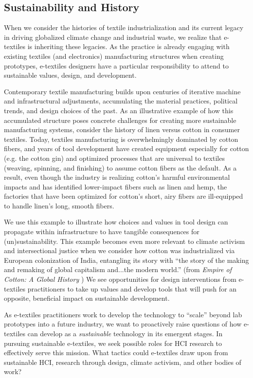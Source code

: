 \subsection{Sustainability and History}

When we consider the histories of textile industrialization and its current legacy in driving globalized climate change and industrial waste, we realize that e-textiles is inheriting these legacies. As the practice is already engaging with existing textiles (and electronics) manufacturing structures when creating prototypes, e-textiles designers have a particular responsibility to attend to sustainable values, design, and development. 

Contemporary textile manufacturing builds upon centuries of iterative machine and infrastructural adjustments, accumulating the material practices, political trends, and design choices of the past. As an illustrative example of how this accumulated structure poses concrete challenges for creating more sustainable manufacturing systems, consider the history of linen versus cotton in consumer textiles. Today, textiles manufacturing is overwhelmingly dominated by cotton fibers, and years of tool development have created equipment especially for cotton (e.g. the cotton gin) and optimized processes that are universal to textiles (weaving, spinning, and finishing) to assume cotton fibers as the default. As a result, even though the industry is realizing cotton's harmful environmental impacts and has identified lower-impact fibers such as linen and hemp, the factories that have been optimized for cotton's short, airy fibers are ill-equipped to handle linen's long, smooth fibers. \cite{kozlowski_handbook_2020}

We use this example to illustrate how choices and values in tool design can propagate within infrastructure to have tangible consequences for (un)sustainability. This example becomes even more relevant to climate activism and intersectional justice when we consider how cotton was industrialized via European colonization of India, entangling its story with ``the story of the making and remaking of global capitalism and...the modern world.'' (from \textit{Empire of Cotton: A Global History} \cite{beckert_empire_2015}) We see opportunities for design interventions from e-textiles practitioners to take up values and develop tools that will push for an opposite, beneficial impact on sustainable development.

As e-textiles practitioners work to develop the technology to ``scale'' beyond lab prototypes into a future industry, we want to proactively raise questions of how e-textiles can develop as a \textit{sustainable} technology in its emergent stages. In pursuing sustainable e-textiles, we seek possible roles for HCI research to effectively serve this mission. What tactics could e-textiles draw upon from sustainable HCI, research through design, climate activism, and other bodies of work?

